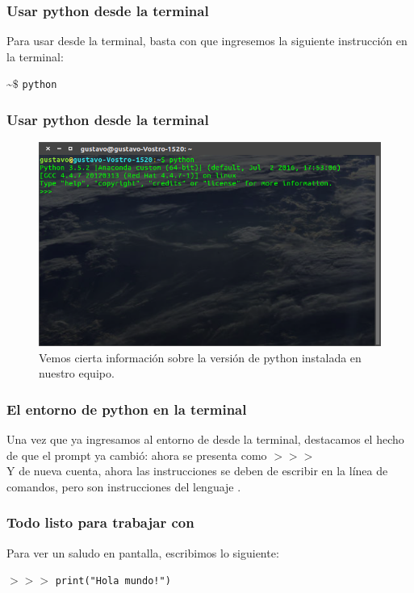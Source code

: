 \begin{frame}
\frametitle{Usar python desde la terminal}
Para usar \python{} desde la terminal, basta con que ingresemos la siguiente instrucción en la terminal:
\begin{center}
\textasciitilde $\$$ \texttt{python} \keys{\return}
\end{center}
\end{frame}
\begin{frame}
\frametitle{Usar python desde la terminal}
\begin{figure}
	\centering
	\includegraphics[scale=0.25]{Terminal_02}
	\caption{Vemos cierta información sobre la versión de python instalada en nuestro equipo.}
\end{figure}
\end{frame}
\begin{frame}
\frametitle{El entorno de python en la terminal}
Una vez que ya ingresamos al entorno de \python{} desde la terminal, destacamos el hecho de que el prompt ya cambió: ahora se presenta como $>>>$
\\
\bigskip
Y de nueva cuenta, ahora las instrucciones se deben de escribir en la línea de comandos, pero son instrucciones del lenguaje \python.	
\end{frame}
\begin{frame}
\frametitle{Todo listo para trabajar con \python}
Para ver un saludo en pantalla, escribimos lo siguiente:
\begin{center}
$>>>$ \texttt{print("Hola mundo!")} \keys{\return}
\end{center}
\end{frame}
